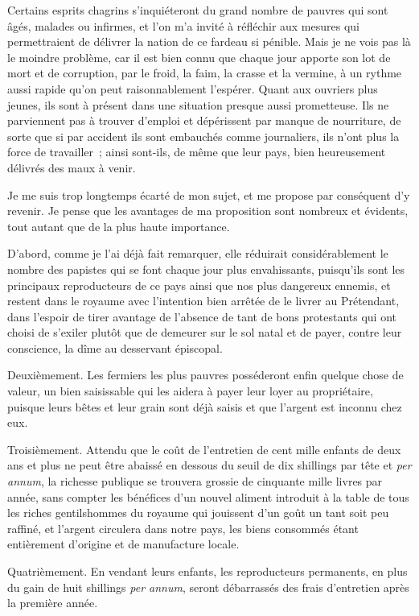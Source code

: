 \documentclass[french,twoside]{book} %
\begin{document}
Certains esprits chagrins s’inquiéteront du grand nombre de pauvres qui sont âgés, malades ou infirmes, et l’on m’a invité à réfléchir aux mesures qui permettraient de délivrer la nation de ce fardeau si pénible. Mais je ne vois pas là le moindre problème, car il est bien connu que chaque jour apporte son lot de mort et de corruption, par le froid, la faim, la crasse et la vermine, à un rythme aussi rapide qu’on peut raisonnablement l’espérer. Quant aux ouvriers plus jeunes, ils sont à présent dans une situation presque aussi prometteuse. Ils ne parviennent pas à trouver d’emploi et dépérissent par manque de nourriture, de sorte que si par accident ils sont embauchés comme journaliers, ils n’ont plus la force de travailler ; ainsi sont-ils, de même que leur pays, bien heureusement délivrés des maux à venir.\par
Je me suis trop longtemps écarté de mon sujet, et me propose par conséquent d’y revenir. Je pense que les avantages de ma proposition sont nombreux et évidents, tout autant que de la plus haute importance.\par
D’abord, comme je l’ai déjà fait remarquer, elle réduirait considérablement le nombre des papistes qui se font chaque jour plus envahissants, puisqu’ils sont les principaux reproducteurs de ce pays ainsi que nos plus dangereux ennemis, et restent dans le royaume avec l’intention bien arrêtée de le livrer au Prétendant, dans l’espoir de tirer avantage de l’absence de tant de bons protestants qui ont choisi de s’exiler plutôt que de demeurer sur le sol natal et de payer, contre leur conscience, la dîme au desservant épiscopal.\par
Deuxièmement. Les fermiers les plus pauvres posséderont enfin quelque chose de valeur, un bien saisissable qui les aidera à payer leur loyer au propriétaire, puisque leurs bêtes et leur grain sont déjà saisis et que l’argent est inconnu chez eux.\par
Troisièmement. Attendu que le coût de l’entretien de cent mille enfants de deux ans et plus ne peut être abaissé en dessous du seuil de dix shillings par tête et \emph{per annum}, la richesse publique se trouvera grossie de cinquante mille livres par année, sans compter les bénéfices d’un nouvel aliment introduit à la table de tous les riches gentilshommes du royaume qui jouissent d’un goût un tant soit peu raffiné, et l’argent circulera dans notre pays, les biens consommés étant entièrement d’origine et de manufacture locale.\par
Quatrièmement. En vendant leurs enfants, les reproducteurs permanents, en plus du gain de huit shillings \emph{per annum}, seront débarrassés des frais d’entretien après la première année.\par
\end{document}
